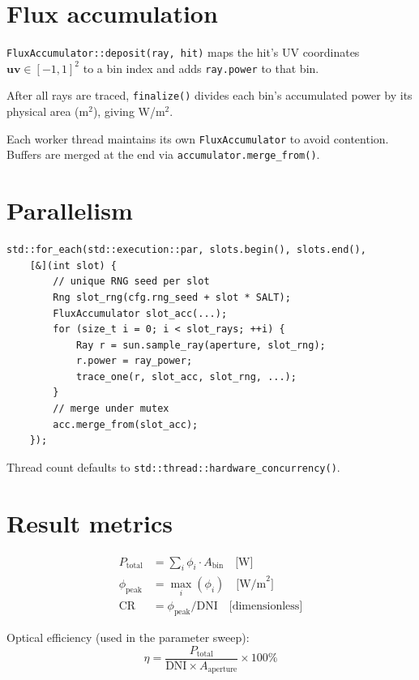 \documentclass[12pt,a4paper]{report}
\begin{document}
\section{Flux accumulation}

\texttt{FluxAccumulator::deposit(ray, hit)} maps the hit's UV coordinates
$\mathbf{uv}\in[-1,1]^2$ to a bin index and adds \texttt{ray.power} to that bin.

After all rays are traced, \texttt{finalize()} divides each bin's accumulated power by its
physical area (m$^2$), giving W/m$^2$.

Each worker thread maintains its own \texttt{FluxAccumulator} to avoid contention.  Buffers
are merged at the end via \texttt{accumulator.merge\_from()}.

\section{Parallelism}

\begin{lstlisting}[style=cpp, caption={Parallel dispatch (Tracer.cpp)}]
std::for_each(std::execution::par, slots.begin(), slots.end(),
    [&](int slot) {
        // unique RNG seed per slot
        Rng slot_rng(cfg.rng_seed + slot * SALT);
        FluxAccumulator slot_acc(...);
        for (size_t i = 0; i < slot_rays; ++i) {
            Ray r = sun.sample_ray(aperture, slot_rng);
            r.power = ray_power;
            trace_one(r, slot_acc, slot_rng, ...);
        }
        // merge under mutex
        acc.merge_from(slot_acc);
    });
\end{lstlisting}

Thread count defaults to \texttt{std::thread::hardware\_concurrency()}.

\section{Result metrics}

\begin{align}
  P_{\text{total}} &= \sum_i \phi_i \cdot A_{\text{bin}} \quad\text{[W]} \\
  \phi_{\text{peak}} &= \max_i(\phi_i) \quad\text{[W/m}^2\text{]} \\
  \text{CR} &= \phi_{\text{peak}} / \text{DNI} \quad\text{[dimensionless]}
\end{align}

Optical efficiency (used in the parameter sweep):
\begin{equation}
  \eta = \frac{P_{\text{total}}}{\text{DNI}\times A_{\text{aperture}}} \times 100\%
\end{equation}
\end{document}

